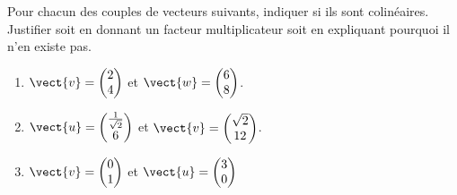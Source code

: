 
\begin{exercice}\label{exosmath-0299}

    Pour chacun des couples de vecteurs suivants, indiquer si ils sont colinéaires. Justifier soit en donnant un facteur multiplicateur soit en expliquant pourquoi il n'en existe pas.
    \begin{multicols}{2}
        \begin{enumerate}
            \item
                \( \vect{ v }=\begin{pmatrix}
                    2    \\ 
                    4    
                \end{pmatrix}\) et \( \vect{ w }=\begin{pmatrix}
                    6    \\ 
                    8    
                \end{pmatrix}\). 
            \item
                \( \vect{ u }=\begin{pmatrix}
                    \frac{1}{ \sqrt{2} }    \\ 
                    6    
                \end{pmatrix}\) et \( \vect{ v }=\begin{pmatrix}
                    \sqrt{2}    \\ 
                    12    
                \end{pmatrix}\).
            \item
                \( \vect{ v }=\begin{pmatrix}
                    0    \\ 
                    1    
                \end{pmatrix}\) et \( \vect{ u }=\begin{pmatrix}
                    3    \\ 
                    0    
                \end{pmatrix}\)
        \end{enumerate}
    \end{multicols}

\end{exercice}
